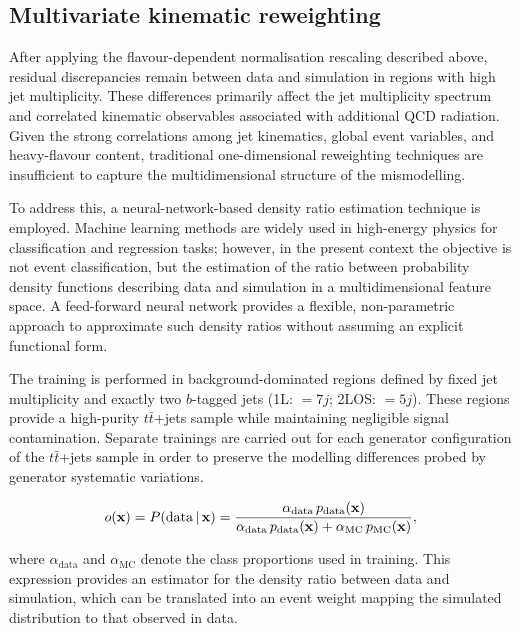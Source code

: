 \subsection{Multivariate kinematic reweighting}
\label{sec:nn_rew_thesis}

After applying the flavour-dependent normalisation rescaling described above,
residual discrepancies remain between data and simulation in regions
with high jet multiplicity.
These differences primarily affect the jet multiplicity spectrum
and correlated kinematic observables associated with additional QCD radiation.
Given the strong correlations among jet kinematics,
global event variables, and heavy-flavour content,
traditional one-dimensional reweighting techniques are insufficient
to capture the multidimensional structure of the mismodelling.

To address this, a neural-network-based density ratio estimation technique is employed.
Machine learning methods are widely used in high-energy physics
for classification and regression tasks;
however, in the present context the objective is not event classification,
but the estimation of the ratio between probability density functions
describing data and simulation in a multidimensional feature space.
A feed-forward neural network provides a flexible, non-parametric approach
to approximate such density ratios without assuming an explicit functional form.

The training is performed in background-dominated regions
defined by fixed jet multiplicity and exactly two $b$-tagged jets
(1L: $=7j$; 2LOS: $=5j$).
These regions provide a high-purity $t\bar{t}$+jets sample
while maintaining negligible signal contamination.
Separate trainings are carried out for each generator configuration
of the $t\bar{t}$+jets sample in order to preserve the modelling differences
probed by generator systematic variations.

\begin{equation}
  o({\bf x}) = P(\mathrm{data}\,|\,{\bf x}) =
  \frac{\alpha_{\mathrm{data}}\,p_{\mathrm{data}}({\bf x})}
       {\alpha_{\mathrm{data}}\,p_{\mathrm{data}}({\bf x}) + \alpha_{\mathrm{MC}}\,p_{\mathrm{MC}}({\bf x})},
\end{equation}

where $\alpha_{\mathrm{data}}$ and $\alpha_{\mathrm{MC}}$ denote the class proportions used in training.
This expression provides an estimator for the density ratio between data and simulation, which can be translated into an event weight mapping the simulated distribution to that observed in data.

